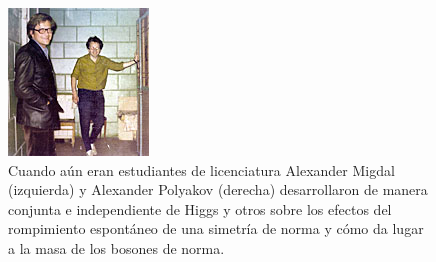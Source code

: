 




\begin{figure}
\centering
\includegraphics[scale=1]{images/polyakov_migdal.jpg}	
\caption{Cuando a\'un eran estudiantes de licenciatura Alexander Migdal (izquierda) y Alexander Polyakov (derecha) desarrollaron de manera conjunta e independiente de Higgs y otros sobre los efectos del rompimiento espont\'aneo de una simetr\'ia de norma y c\'omo da lugar a la masa de los bosones de norma.}
\end{figure}



